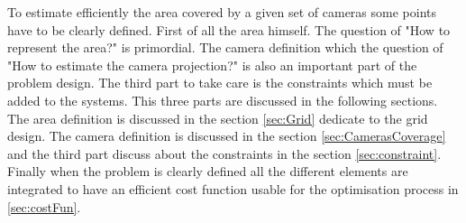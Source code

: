 To estimate efficiently the area covered by a given set of cameras some points have to be clearly defined.
First of all the area himself. The question of "How to represent the area?" is  primordial. The camera definition  which the question of  "How to estimate the camera projection?" is also an important part of the problem design.  The third part to take care  is the constraints which must be added to the systems.
 This three parts are discussed in the following sections. The area definition is discussed in the section \ref{sec:Grid} dedicate to the grid design. The camera definition is discussed in the section \ref{sec:CamerasCoverage} and the third part discuss about the constraints in the section \ref{sec:constraint}.\\
Finally when the problem is clearly defined all the different elements are integrated to have an efficient cost function usable for the optimisation process in \ref{sec:costFun}.

   
%
%
% 

